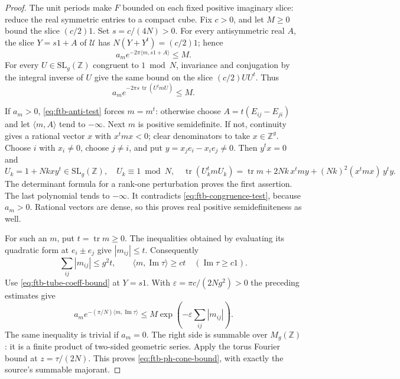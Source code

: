 \begin{proof}
The unit periods make \(F\) bounded on each fixed positive
imaginary slice: reduce the real symmetric entries to a compact
cube.  Fix \(c>0\), and let \(M\geq0\) bound the slice
\((c/2)1\).  Set \(s=c/(4N)>0\).
For every antisymmetric real \(A\), the slice \(Y=s1+A\)
of \(\mathcal U\) has
\(N(Y+Y^t)=(c/2)1\); hence
\[
 a_m e^{-2\pi\langle m,s1+A\rangle}\leq M.
 \tag{W5}\label{eq:ftb-anti-test}
\]
For every \(U\in\mathrm{SL}_g(\mathbb Z)\) congruent to \(1\bmod N\),
invariance and conjugation by the integral inverse of \(U\)
give the same bound on the slice \((c/2)UU^t\).  Thus
\[
 a_m e^{-2\pi s\,\operatorname{tr}(U^tmU)}\leq M.
 \tag{W6}\label{eq:ftb-congruence-test}
\]

If \(a_m>0\), \eqref{eq:ftb-anti-test} forces \(m=m^t\):
otherwise choose \(A=t(E_{ij}-E_{ji})\) and let
\(\langle m,A\rangle\) tend to \(-\infty\).
Next \(m\) is positive semidefinite.
If not, continuity gives a rational vector \(x\) with \(x^tmx<0\);
clear denominators to take \(x\in\mathbb Z^g\).
Choose \(i\) with \(x_i\ne0\), choose \(j\ne i\), and put
\(y=x_je_i-x_ie_j\ne0\).
Then \(y^tx=0\) and
\[
 U_k=1+Nkxy^t\in\mathrm{SL}_g(\mathbb Z),\quad
 U_k\equiv1\bmod N,\quad
 \operatorname{tr}(U_k^tmU_k)
 =\operatorname{tr}m+2Nk\,x^tmy
                 +(Nk)^2(x^tmx)\,y^ty .
\]
The determinant formula for a rank-one perturbation proves the
first assertion.  The last polynomial tends to \(-\infty\).
It contradicts \eqref{eq:ftb-congruence-test}, because \(a_m>0\).
Rational vectors are dense, so this proves real positive
semidefiniteness as well.

For such an \(m\), put \(t=\operatorname{tr}m\geq0\).
The inequalities obtained by evaluating its quadratic form at
\(e_i\pm e_j\) give \(|m_{ij}|\leq t\).  Consequently
\[
       \sum_{ij}|m_{ij}|\leq g^2t,\qquad
       \langle m,\operatorname{Im}\tau\rangle\geq ct
                    \quad(\operatorname{Im}\tau\geq c1).
\]
Use \eqref{eq:ftb-tube-coeff-bound} at \(Y=s1\).
With \(\varepsilon=\pi c/(2Ng^2)>0\) the preceding estimates give
\[
 a_m e^{-(\pi/N)\langle m,\operatorname{Im}\tau\rangle}
       \leq M\exp\!\left(-\varepsilon\sum_{ij}|m_{ij}|\right).
 \tag{W7}\label{eq:ftb-ph-summable}
\]
The same inequality is trivial if \(a_m=0\).
The right side is summable over \(M_g(\mathbb Z)\): it is a
finite product of two-sided geometric series.
Apply the torus Fourier bound at \(z=\tau/(2N)\).
This proves \eqref{eq:ftb-ph-cone-bound}, with exactly the
source's summable majorant.
\end{proof}

